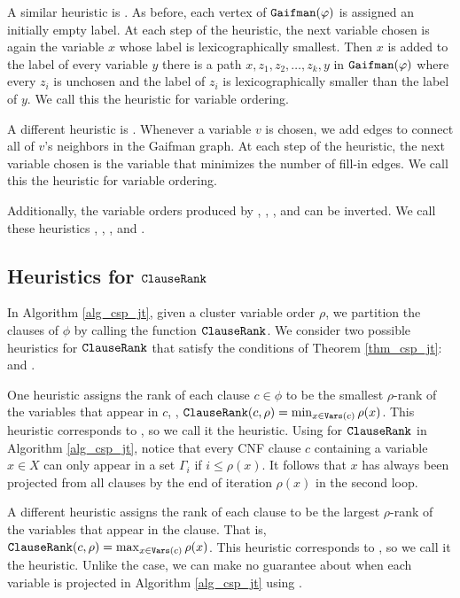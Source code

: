 A similar heuristic is  \cite{koster2001treewidth}.
As before, each vertex of $\texttt{\upshape Gaifman}(\varphi)$ is assigned an initially empty label.
At each step of the heuristic, the next variable chosen is again the variable $x$ whose label is lexicographically smallest.
Then $x$ is added to the label of every variable $y$ \st{} there is a path $x, z_1, z_2, \ldots, z_k, y$ in $\texttt{\upshape Gaifman}(\varphi)$ where every $z_i$ is unchosen and the label of $z_i$ is lexicographically smaller than the label of $y$.
We call this the \Lexm{} heuristic for variable ordering.

A different heuristic is  \cite{dechter2003constraint}.
Whenever a variable $v$ is chosen, we add  edges to connect all of $v$'s neighbors in the Gaifman graph.
At each step of the heuristic, the next variable chosen is the variable that minimizes the number of fill-in edges.
We call this the \Minfill{} heuristic for variable ordering.

Additionally, the variable orders produced by \Mcs{}, \Lexp{}, \Lexm, and \Minfill{} can be inverted.
We call these heuristics \Invmcs, \Invlexp, \Invlexm, and \Invminfill.


\subsection{Heuristics for $\texttt{\upshape ClauseRank}$}

In Algorithm \ref{alg_csp_jt}, given a cluster variable order $\rho$, we partition the clauses of $\phi$ by calling the function $\texttt{\upshape ClauseRank}$.
We consider two possible heuristics for $\texttt{\upshape ClauseRank}$ that satisfy the conditions of Theorem \ref{thm_csp_jt}: \Be{} and \Bm{}.

One heuristic assigns the rank of each clause $c \in \phi$ to be the smallest $\rho$-rank of the variables that appear in $c$, \ie, $\texttt{\upshape ClauseRank}(c, \rho) = \min_{x \in \texttt{\upshape Vars}(c)} \rho(x)$.
This heuristic corresponds to  \cite{dechter1999bucket}, so we call it the \Be{} heuristic.
Using \Be{} for $\texttt{\upshape ClauseRank}$ in Algorithm \ref{alg_csp_jt}, notice that every CNF clause $c$ containing a variable $x \in X$ can only appear in a set $\Gamma_i$ if $i \le \rho(x)$.
It follows that $x$ has always been projected from all clauses by the end of iteration $\rho(x)$ in the second loop.

A different heuristic assigns the rank of each clause to be the largest $\rho$-rank of the variables that appear in the clause.
That is, $\texttt{\upshape ClauseRank}(c, \rho) = \max_{x \in \texttt{\upshape Vars}(c)} \rho(x)$.
This heuristic corresponds to  \cite{bouquet1999gestion}, so we call it the \Bm{} heuristic.
Unlike the \Be{} case, we can make no guarantee about when each variable is projected in Algorithm \ref{alg_csp_jt} using \Bm{}.

